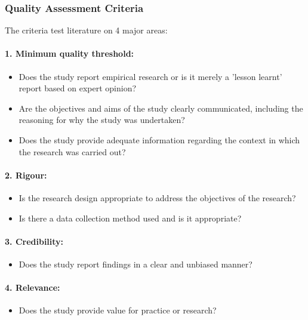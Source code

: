 \documentclass[a4paper,12pt]{article}
\begin{document}
\subsubsection{Quality Assessment Criteria}
The criteria test literature on 4 major areas:

\paragraph{1. Minimum quality threshold:}
\begin{itemize}
    \item Does the study report empirical research or is it merely a 'lesson learnt' report based on expert opinion?
    \item Are the objectives and aims of the study clearly communicated, including the reasoning for why the study was undertaken?
    \item Does the study provide adequate information regarding the context in which the research was carried out?
\end{itemize}

\paragraph{2. Rigour:}
\begin{itemize}
    \item Is the research design appropriate to address the objectives of the research?
    \item Is there a data collection method used and is it appropriate?
\end{itemize}

\paragraph{3. Credibility:}
\begin{itemize}
    \item Does the study report findings in a clear and unbiased manner?
\end{itemize}

\paragraph{4. Relevance:}
\begin{itemize}
    \item Does the study provide value for practice or research?
\end{itemize}
\end{document}
